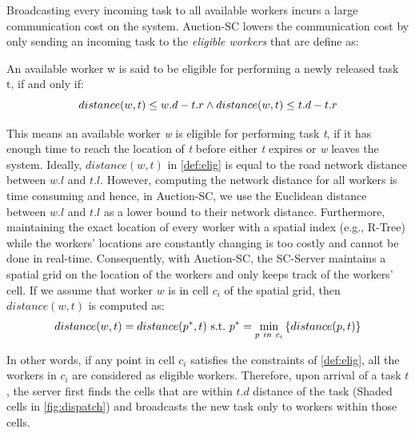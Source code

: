 Broadcasting every incoming task to all available workers incurs a large communication cost on the system. Auction-SC lowers the communication cost by only sending an incoming task to the \textit{eligible workers} that are define as:
\vspace{-0.05in}
\begin{definition} 
\label{def:elig}
An available worker w is said to be eligible for performing a newly released task t, if and only if:
\vspace{-0.05in}
\begin{equation*}
distance(w, t) \leq w.d - t.r \wedge distance(w, t) \leq t.d - t.r
\vspace{-0.05in}
\end{equation*}
\end{definition}
\vspace{-0.05in}
\noindent This means an available worker \textit{w} is eligible for performing task \textit{t}, if it has enough time to reach the location of \textit{t} before either \textit{t} expires or \textit{w} leaves the system. Ideally, $distance(w, t)$ in \cref{def:elig} is equal to the road network distance between $w.l$ and $t.l$. However, computing the network distance for all workers is time consuming and hence, in Auction-SC, we use the Euclidean distance between $w.l$ and $t.l$ as a lower bound to their network distance. Furthermore, maintaining the exact location of every worker with a spatial index (e.g., R-Tree) while the workers' locations are constantly changing is too costly and cannot be done in real-time. Consequently, with Auction-SC, the SC-Server maintains a spatial grid on the location of the workers and only keeps track of the workers' cell. If we assume that worker $w$ is in cell $c_i$ of the spatial grid, then $distance(w, t)$ is computed as:
\vspace{-0.1in}
\begin{equation*}
distance(w, t) = distance(p^*, t) \ \mathrm{s.t.} \ p^* = \min_{p\ in\ c_i} \left\lbrace distance(p, t) \right\rbrace 
\vspace{-0.1in}
\end{equation*}

\noindent In other words, if any point in cell $c_i$ satisfies the constraints of \cref{def:elig}, all the workers in $c_i$ are considered as eligible workers. Therefore, upon arrival of a task $t$, the server first finds the cells that are within $t.d$ distance of the task (Shaded cells in \cref{fig:dispatch}) and broadcasts the new task only to workers within those cells.

